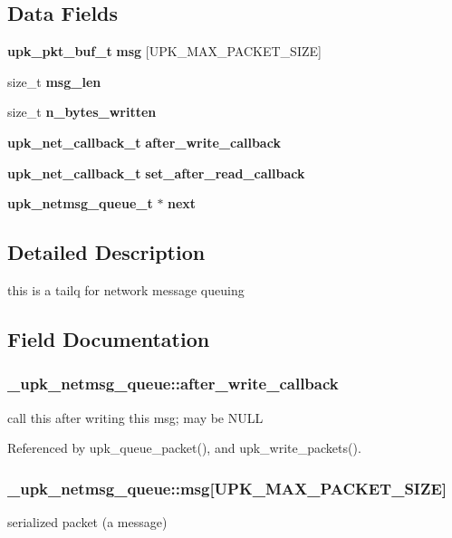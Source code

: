 \subsection*{Data Fields}
\begin{DoxyCompactItemize}
\item 
{\bf upk\_\-pkt\_\-buf\_\-t} {\bf msg} [UPK\_\-MAX\_\-PACKET\_\-SIZE]
\item 
size\_\-t {\bf msg\_\-len}
\item 
size\_\-t {\bf n\_\-bytes\_\-written}
\item 
{\bf upk\_\-net\_\-callback\_\-t} {\bf after\_\-write\_\-callback}
\item 
{\bf upk\_\-net\_\-callback\_\-t} {\bf set\_\-after\_\-read\_\-callback}
\item 
{\bf upk\_\-netmsg\_\-queue\_\-t} $\ast$ {\bf next}
\end{DoxyCompactItemize}


\subsection{Detailed Description}
this is a tailq for network message queuing 

\subsection{Field Documentation}
\subsubsection[{after\_\-write\_\-callback}]{ {\bf \_\-upk\_\-netmsg\_\-queue::after\_\-write\_\-callback}}\label{struct__upk__netmsg__queue_ac08757fcf4cb2cf80d69d4aaa47f0dba}
call this after writing this msg; may be NULL 

Referenced by upk\_\-queue\_\-packet(), and upk\_\-write\_\-packets().

\subsubsection[{msg}]{ {\bf \_\-upk\_\-netmsg\_\-queue::msg}[UPK\_\-MAX\_\-PACKET\_\-SIZE]}\label{struct__upk__netmsg__queue_a6203d554591e060f8a3f74d3c41743e8}
serialized packet (a message) 

